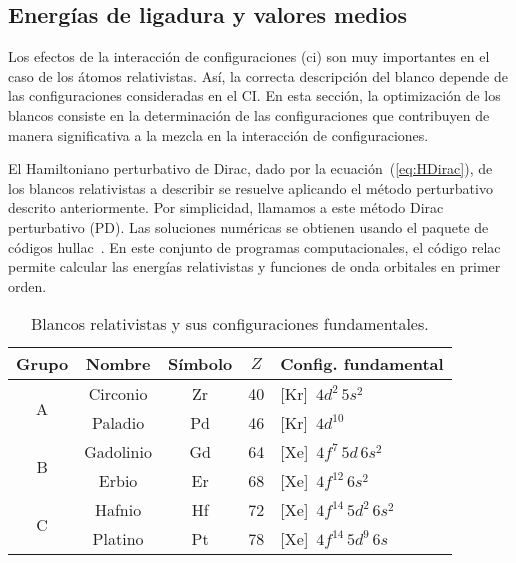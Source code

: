 \subsection{Energías de ligadura y valores medios}
\label{subsec:results-target}

Los efectos de la interacción de configuraciones (\acs{ci}) son muy 
importantes en el caso de los átomos relativistas. Así, la correcta 
descripción del blanco depende de las configuraciones consideradas en 
el CI. En esta sección, la optimización de los blancos consiste en la 
determinación de las configuraciones que contribuyen de manera 
significativa a la mezcla en la interacción de configuraciones. 

El Hamiltoniano perturbativo de Dirac, dado por la 
ecuación~(\ref{eq:HDirac}), de los blancos relativistas a describir se 
resuelve aplicando el método perturbativo descrito anteriormente. Por 
simplicidad, llamamos a este método Dirac perturbativo (PD). Las 
soluciones numéricas se obtienen usando el paquete de códigos 
{\sc hullac}~\cite{BarShalom:01}. En este conjunto de programas 
computacionales, el código {\sc relac} permite calcular las energías 
relativistas y funciones de onda orbitales en primer orden. 

\begin{table*}[t]
\centering
\begin{tabular}{|c|c|c|c|l|}
\hline
Grupo & Nombre   & Símbolo & $Z$ & Config. fundamental \\
\hline
\hline
\multirow{2}{*}{A} & Circonio & Zr & 40 & [Kr]~$4d^2\,5s^2$ \\
                   & Paladio  & Pd & 46 & [Kr]~$4d^{10}$ \\
\hline
\multirow{2}{*}{B} & Gadolinio & Gd & 64 & [Xe]~$4f^7\,5d\,6s^2$ \\
                   & Erbio     & Er & 68 & [Xe]~$4f^{12}\,6s^2$ \\
\hline
\multirow{2}{*}{C} & Hafnio  & Hf & 72 & [Xe]~$4f^{14}\,5d^2\,6s^2$ \\
                   & Platino & Pt & 78 & [Xe]~$4f^{14}\,5d^9\,6s$ \\
\hline
\end{tabular}
\caption[Blancos relativistas y sus configuraciones fundamentales]
{Blancos relativistas y sus configuraciones fundamentales.}
\label{tab:gruposrelat} 
\end{table*}

